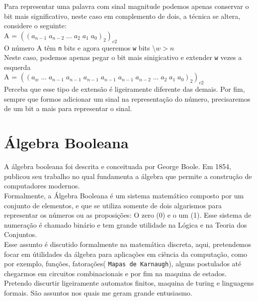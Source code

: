 \documentclass[12pt, onecolumn]{article}
\begin{document}
	Para representar uma palavra com sinal magnitude
	podemos apenas conservar o bit mais significativo, neste caso
	em complemento de dois, a técnica se altera, considere o seguinte:\\
	\newline
	A = $((a_{n-1} \; a_{n-2} \; ... \; a_{2} \; a_{1} \; a_{0})_2)_{c2}$\\
	\newline
	O número A têm \texttt{n} bits e agora queremos \texttt{w} bits
	$\setminus w > n$ \\
	\newline
	Neste caso, podemos apenas pegar o bit mais sinigicativo e extender
	\texttt{w} vezes a esquerda\\
	\newline
	A = $((a_{w} \; ... \;a_{n-1}\;a_{n-1}\;a_{n-1}\;a_{n-1}\;a_{n-1} 
	\; a_{n-2} \; ... \; a_{2} \; a_{1} \; a_{0})_2)_{c2}$\\
	\newline
	Perceba que esse tipo de extensão é ligeiramente diferente das demais.
	Por fim, sempre que formos adicionar um sinal na representação do
	número, precisaremos de um bit a mais para representar o sinal.

	\section{\centering Álgebra Booleana}

	A álgebra booleana foi descrita e conceituada por George Boole. 
	Em 1854, publicou seu trabalho no qual fundamenta a álgebra que 
	permite a construção de computadores modernos.\\
	\newline
	Formalmente, a Álgebra Booleana é um sistema matemático composto 
	por um conjunto de elementos, e que se utiliza somente de dois 
	algarismos para representar os números ou as proposições: 
	O zero (0) e o um (1). Esse sistema de numeração é chamado binário 
	e tem grande utilidade na Lógica e na Teoria dos Conjuntos.\\
	\newline
	Esse assunto é discutido formalmente na matemática discreta, 
	aqui, pretendemos focar em útilidades da álgebra para aplicações
	em ciência da computação, como por exemplo, funções, fatorações( 
	\texttt{Mapas de Karnaugh}), alguns postulados até chegarmos em 
	circuitos combinacionais e por fim na maquina de estados.\\
	\newline
	Pretendo discurtir ligeiramente automatos finitos, maquina de turing 
	e linguagens formais. São assuntos nos quais me geram 
	grande entusiasmo.
\end{document}
